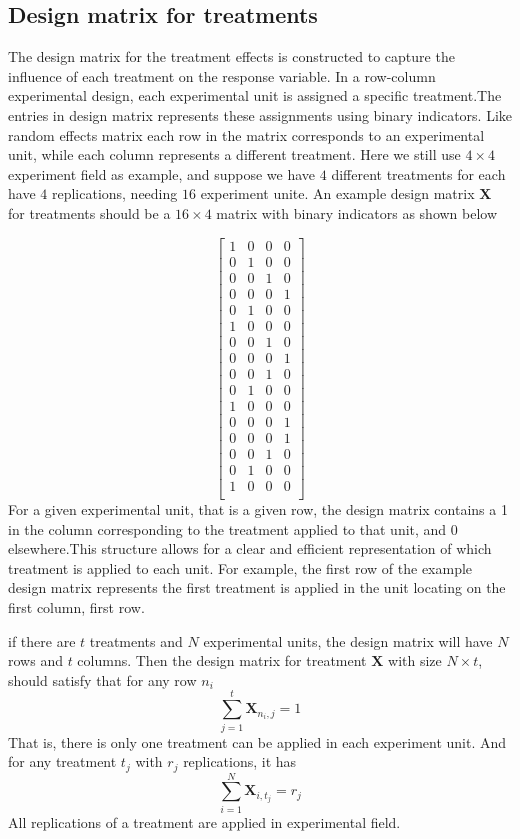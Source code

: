 \documentclass[
  a4paper,
  oneside,
  openany,
  12pt,
  onecolumn]{book}
\theoremstyle{plain}
\theoremstyle{definition}
\theoremstyle{remark}
\begin{document}
\subsection{Design matrix for
treatments}\label{design-matrix-for-treatments}

The design matrix for the treatment effects is constructed to capture
the influence of each treatment on the response variable. In a
row-column experimental design, each experimental unit is assigned a
specific treatment.The entries in design matrix represents these
assignments using binary indicators. Like random effects matrix each row
in the matrix corresponds to an experimental unit, while each column
represents a different treatment. Here we still use \(4\times 4\)
experiment field as example, and suppose we have \(4\) different
treatments for each have \(4\) replications, needing \(16\) experiment
unite. An example design matrix \(\boldsymbol{X}\) for treatments should
be a \(16\times 4\) matrix with binary indicators as shown below

\[
\begin{bmatrix}
1 & 0 & 0 & 0\\
0 & 1 & 0 & 0\\
0 & 0 & 1 & 0\\
0 & 0 & 0 & 1\\
0 & 1 & 0 & 0\\
1 & 0 & 0 & 0\\
0 & 0 & 1 & 0\\
0 & 0 & 0 & 1\\
0 & 0 & 1 & 0\\
0 & 1 & 0 & 0\\
1 & 0 & 0 & 0\\
0 & 0 & 0 & 1\\
0 & 0 & 0 & 1\\
0 & 0 & 1 & 0\\
0 & 1 & 0 & 0\\
1 & 0 & 0 & 0\\
\end{bmatrix}
\] For a given experimental unit, that is a given row, the design matrix
contains a 1 in the column corresponding to the treatment applied to
that unit, and 0 elsewhere.This structure allows for a clear and
efficient representation of which treatment is applied to each unit. For
example, the first row of the example design matrix represents the first
treatment is applied in the unit locating on the first column, first
row.

if there are \(t\) treatments and \(N\) experimental units, the design
matrix will have \(N\) rows and \(t\) columns. Then the design matrix
for treatment \(\boldsymbol{X}\) with size \(N\times t\), should satisfy
that for any row \(n_{i}\) \[
\sum_{j=1}^{t} \boldsymbol{X}_{n_{i},j}=1
\] That is, there is only one treatment can be applied in each
experiment unit. And for any treatment \(t_j\) with \(r_j\)
replications, it has \[
\sum_{i=1}^{N}\boldsymbol{X}_{i,t_j}=r_j
\] All replications of a treatment are applied in experimental field.
\end{document}

